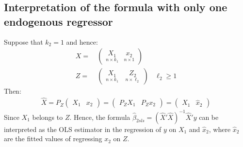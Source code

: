 \documentclass[a4paper,twoside,11pt]{article}
\begin{document}
\subsection{Interpretation of the formula with only one endogenous regressor}
Suppose that $k_2 =1$ and hence:
\begin{equation*}
\begin{aligned}
X =& \  \begin{pmatrix}
\underset{n \times k_1}{X_1} & \underset{n \times 1}{x_2}
\end{pmatrix} \\
Z =& \ \begin{pmatrix}
\underset{n \times k_1}{X_1} & \ \underset{n \times \ell_2}{Z_2}
\end{pmatrix} \ \ \ \ \ell_2 \ge 1
\end{aligned} 
\end{equation*}
Then:
\begin{equation*}
\begin{aligned}
\hat{X} = P_Z \begin{pmatrix}
X_1 & x_2
\end{pmatrix} = \begin{pmatrix}
P_Z X_1 & P_Z x_2
\end{pmatrix} = \begin{pmatrix}
X_1 & \hat{x}_2
\end{pmatrix}
\end{aligned} 
\end{equation*}
Since $X_1$ belongs to $Z$. 
\newline
\newline
Hence, the formula $\hat{\beta}_{2sls}= (\hat{X}'\hat{X})^{-1}\hat{X}'y$ can be interpreted as the OLS estimator in the regression of $y$ on $X_1$ and $\hat{x}_2$, where $\hat{x}_2$ are the fitted values of regressing $x_2$ on $Z$. 
\end{document}
